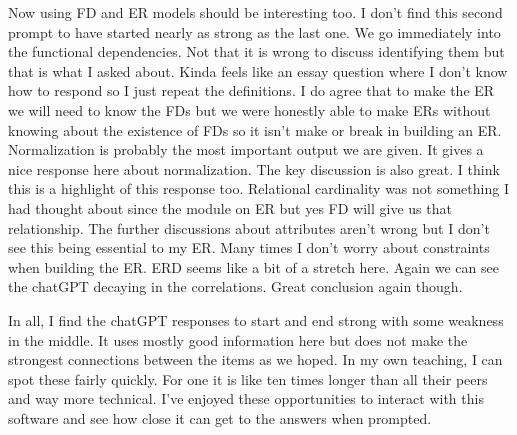 \documentclass[11pt]{article}
\begin{document}
\begin{enumerate}
Now using FD and ER models should be interesting too.   I don't find this second prompt to have started nearly as strong as the last one.  We go immediately into the functional dependencies.  Not that it is wrong to discuss identifying them but that is what I asked about.  Kinda feels like an essay question where I don't know how to respond so I just repeat the definitions.  I do agree that to make the ER we will need to know the FDs but we were honestly able to make ERs without knowing about the existence of FDs so it isn't make or break in building an ER.  Normalization is probably the most important output we are given.  It gives a nice response here about normalization.  The key discussion is also great.  I think this is a highlight of this response too.  Relational cardinality was not something I had thought about since the module on ER but yes FD will give us that relationship.  The further discussions about attributes aren't wrong but I don't see this being essential to my ER.  Many times I don't worry about constraints when building the ER.  ERD seems like a bit of a stretch here.  Again we can see the chatGPT decaying in the correlations.  Great conclusion again though.

In all, I find the chatGPT responses to start and end strong with some weakness in the middle.  It uses mostly good information here but does not make the strongest connections between the items as we hoped.  In my own teaching, I can spot these fairly quickly.  For one it is like ten times longer than all their peers and way more technical.  I've enjoyed these opportunities to interact with this software and see how close it can get to the answers when prompted.
\end{enumerate}
\end{document}
